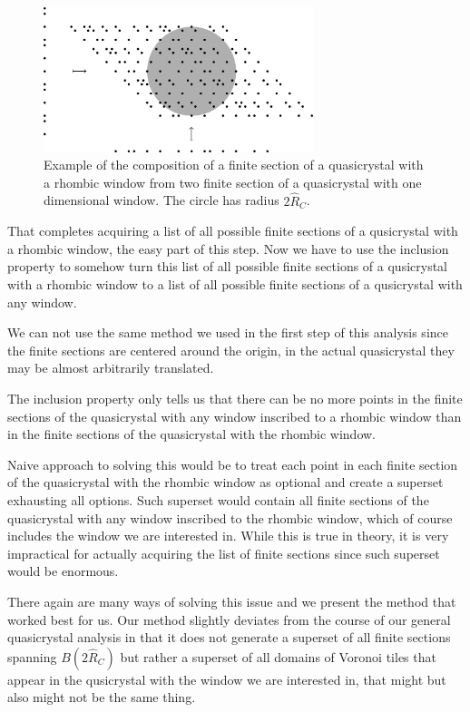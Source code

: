 \documentclass[text.tex]{subfiles}
\begin{document}
\begin{figure}[h!]
\centering
\includegraphics[width=0.7\textwidth]{img/2D/compositionFinite}
\caption{Example of the composition of a finite section of a quasicrystal with a rhombic window from two finite section of a quasicrystal with one dimensional window. The circle has radius $2\hat{R}_C$. }
\label{fig_quasicrystalExampleComposition}
\end{figure}

That completes acquiring a list of all possible finite sections of a qusicrystal with a rhombic window, the easy part of this step. Now we have to use the inclusion property to somehow turn this list of all possible finite sections of a qusicrystal with a rhombic window to a list of all possible finite sections of a qusicrystal with any window. 

We can not use the same method we used in the first step of this analysis since the finite sections are centered around the origin, in the actual quasicrystal they may be almost arbitrarily translated. 

The inclusion property only tells us that there can be no more points in the finite sections of the quasicrystal with any window inscribed to a rhombic window than in the finite sections of the quasicrystal with the rhombic window. 

Naive approach to solving this would be to treat each point in each finite section of the quasicrystal with the rhombic window as optional and create a superset exhausting all options. Such superset would contain all finite sections of the quasicrystal with any window inscribed to the rhombic window, which of course includes the window we are interested in. While this is true in theory, it is very impractical for actually acquiring the list of finite sections since such superset would be enormous. 

There again are many ways of solving this issue and we present the method that worked best for us. Our method slightly deviates from the course of our general quasicrystal analysis in that it does not generate a superset of all finite sections spanning $B(2\hat{R}_C)$ but rather a superset of all domains of Voronoi tiles that appear in the qusicrystal with the window we are interested in, that might but also might not be the same thing. 
\end{document}
